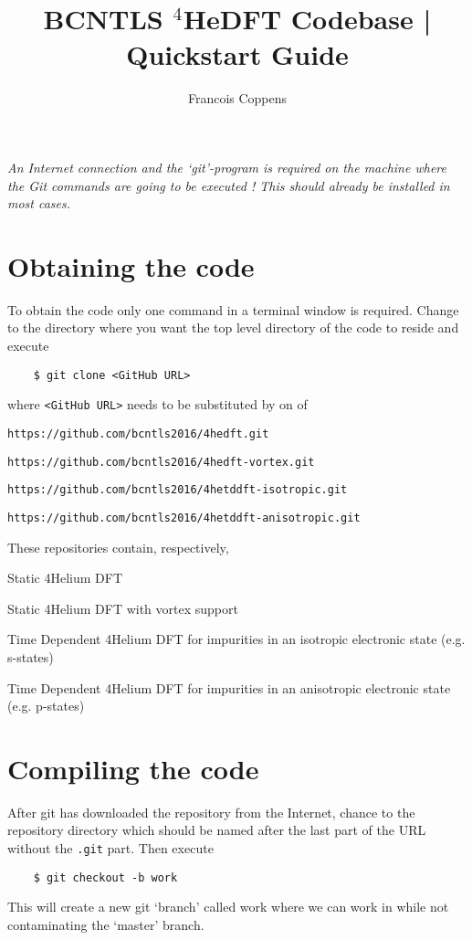 \documentclass[10pt,a4paper]{article}
\author{Francois Coppens}
\title{BCNTLS $^4$HeDFT Codebase | Quickstart Guide }
\begin{document}
	\maketitle
	\emph{An Internet connection and the `git'-program is required on the machine where the Git commands are going to be executed ! This should already be installed in most cases.}
	\section{Obtaining the code}
	To obtain the code only one command in a terminal window is required. Change to the directory where you want the top level directory of the code to reside and execute
	\begin{verbatim}
	$ git clone <GitHub URL>
	\end{verbatim}
	where \verb|<GitHub URL>| needs to be substituted by on of
	\begin{description}[align=right,labelwidth=0.35cm]
		\item [1.] \verb|https://github.com/bcntls2016/4hedft.git|
		\item[2.] \verb|https://github.com/bcntls2016/4hedft-vortex.git|
		\item[3.] \verb|https://github.com/bcntls2016/4hetddft-isotropic.git|
		\item[4.] \verb|https://github.com/bcntls2016/4hetddft-anisotropic.git|
	\end{description}

	\noindent These repositories contain, respectively,

	\begin{description}[align=right,labelwidth=0.35cm]
	\item [1.] Static 4Helium DFT
	\item[2.] Static 4Helium DFT with vortex support
	\item[3.] Time Dependent 4Helium DFT for impurities in an isotropic electronic state (e.g. s-states)
	\item[4.] Time Dependent 4Helium DFT for impurities in an anisotropic electronic state (e.g. p-states)
	\end{description}
	
	\section{Compiling the code}
	After git has downloaded the repository from the Internet, chance to the repository directory which should be named after the last part of the URL without the \verb|.git| part. Then execute
	\begin{verbatim}
	$ git checkout -b work
	\end{verbatim}
	This will create a new git `branch' called work where we can work in while not contaminating the `master' branch. 
	
\end{document}
